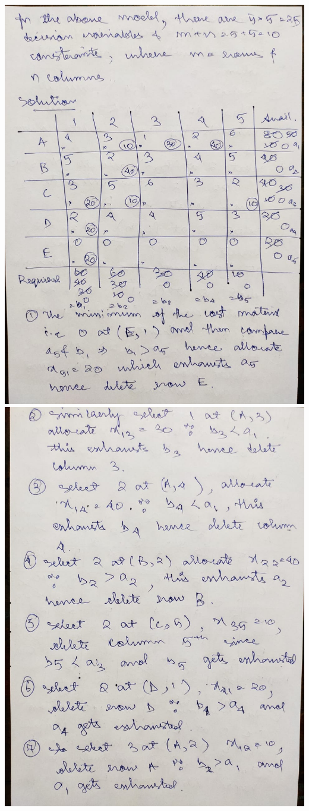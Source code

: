\documentclass[12pt, letterpaper, twoside]{book}
\begin{document}
\includegraphics[width=\paperwidth, height=\paperheight]{Page11}
\includegraphics[width=\paperwidth, height=\paperheight]{Page12}
\end{document}

